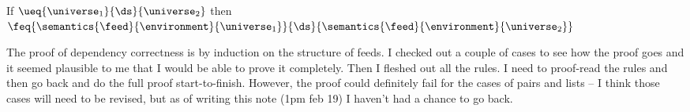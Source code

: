 \begin{theorem}
If $\ueq{\universe_1}{\ds}{\universe_2}$ then
$\feq{\semantics{\feed}{\environment}{\universe_1}}{\ds}{\semantics{\feed}{\environment}{\universe_2}}$
\end{theorem}

The proof of dependency correctness is by induction on the structure of feeds.  I
checked out a couple of cases to see how the proof goes and it seemed plausible to
me that I would be able to prove it completely.   
Then I fleshed out all the rules.  I need to proof-read the rules and then go back
and do the full proof start-to-finish.  However, the proof could definitely
fail for the cases of pairs and lists -- I think those cases will need to be revised,
but as of writing this note (1pm feb 19) I haven't had a chance to go back.  





